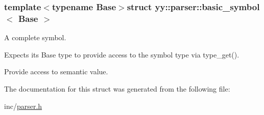 \subsubsection*{template$<$typename Base$>$struct yy\+::parser\+::basic\+\_\+symbol$<$ Base $>$}

A complete symbol.

Expects its Base type to provide access to the symbol type via type\+\_\+get().

Provide access to semantic value. 

The documentation for this struct was generated from the following file\+:\begin{DoxyCompactItemize}
\item 
inc/\hyperlink{parser_8h}{parser.\+h}\end{DoxyCompactItemize}
